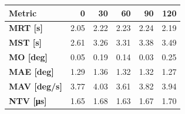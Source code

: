 \begin{tabular*}{\textwidth}{@{\extracolsep{\fill}}l|rrrrr}
    \toprule
    \textbf{Metric} & \textbf{0} & \textbf{30} & \textbf{60} & \textbf{90} & \textbf{120} \\
    \midrule
    \textbf{MRT [s]} & 2.05 & 2.22 & 2.23 & 2.24 & 2.19 \\
    \textbf{MST [s]} & 2.61 & 3.26 & 3.31 & 3.38 & 3.49 \\
    \textbf{MO  [deg]} & 0.05 & 0.19 & 0.14 & 0.03 & 0.25 \\
    \textbf{MAE [deg]} & 1.29 & 1.36 & 1.32 & 1.32 & 1.27 \\
    \textbf{MAV [deg/s]} & 3.77 & 4.03 & 3.61 & 3.82 & 3.94 \\
    \textbf{NTV [\si{\micro\second}]} & 1.65 & 1.68 & 1.63 & 1.67 & 1.70 \\
    \bottomrule
\end{tabular*}

